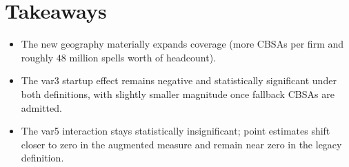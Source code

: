 \documentclass[12pt]{article}
\begin{document}
\section*{Takeaways}
\begin{itemize}
  \item The new geography materially expands coverage (more CBSAs per firm and roughly $48$ million spells worth of headcount).
  \item The var3 startup effect remains negative and statistically significant under both definitions, with slightly smaller magnitude once fallback CBSAs are admitted.
  \item The var5 interaction stays statistically insignificant; point estimates shift closer to zero in the augmented measure and remain near zero in the legacy definition.
\end{itemize}
\end{document}

